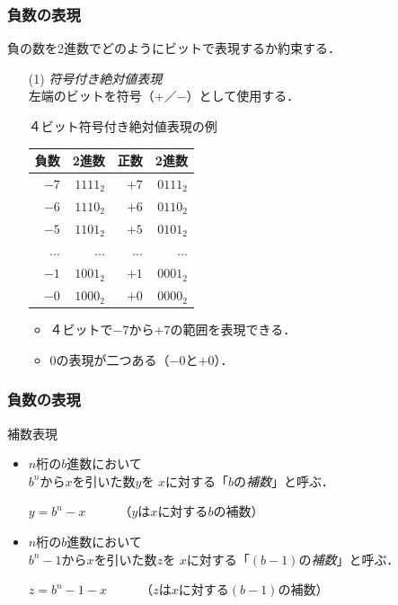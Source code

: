 \documentclass[handout]{beamer}        %
\begin{document}
\begin{frame}
  \frametitle{負数の表現}
負の数を2進数でどのようにビットで表現するか約束する．

\begin{enumerate}
\item[(1)] \emph{符号付き絶対値表現}\\
  左端のビットを符号（$+$／$-$）として使用する．
  \begin{itembox}[l]{４ビット符号付き絶対値表現の例}
    \begin{minipage}{0.5\columnwidth}
      \begin{tabular}{ r | r || r | r }
        \hline
        \hline
        負数 & 2進数    & 正数 & 2進数 \\
        \hline
        $-7$ & $1111_2$ & $+7$ & $0111_2$ \\
        $-6$ & $1110_2$ & $+6$ & $0110_2$ \\
        $-5$ & $1101_2$ & $+5$ & $0101_2$ \\
        ...  & ...      & ...  & ... \\
        $-1$ & $1001_2$ & $+1$ & $0001_2$ \\
        $-0$ & $1000_2$ & $+0$ & $0000_2$ \\
      \end{tabular}
    \end{minipage}
    \begin{minipage}{0.5\columnwidth}
      \begin{itemize}
      \item ４ビットで$-7$から$+7$の範囲を表現できる．
      \item $0$の表現が二つある（$-0$と$+0$）．
      \end{itemize}
    \end{minipage}
  \end{itembox}
\end{enumerate}
\end{frame}

\begin{frame}
  \frametitle{負数の表現}
  \begin{itembox}[l]{補数表現}
    \begin{itemize}
    \item $n$桁の$b$進数において \\ $b^n$から$x$を引いた数$y$を
      $x$に対する「$b$の\emph{補数}」と呼ぶ．
      \centerline{$y = b^n -x$ ~~~~  （$y$は$x$に対する$b$の補数）}
    \item $n$桁の$b$進数において \\$b^n-1$から$x$を引いた数$z$を
      $x$に対する「$(b-1)$の\emph{補数}」と呼ぶ．
      \centerline{$z = b^n - 1 -x$ ~~~~ （$z$は$x$に対する$(b-1)$の補数）}
    \end{itemize}
  \end{itembox}
\end{frame}
\end{document}

